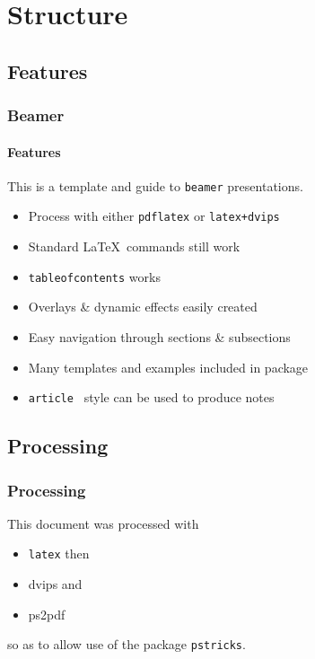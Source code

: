\section{Structure}
\subsection{Features}
\begin{frame}
\frametitle{Beamer}
\framesubtitle{Features}
This is a template and guide to \texttt{beamer} presentations.
\begin{itemize}
\item Process with either \texttt{pdflatex} or \texttt{latex+dvips}\pause
\item Standard \LaTeX\ commands still work\pause
\item \texttt{tableofcontents} works \pause
\item Overlays \&  dynamic effects easily created\pause
\item Easy navigation through sections \&  subsections\pause
\item Many templates and examples included in package\pause
\item \texttt{article } style can be used to produce notes
\end{itemize}
\end{frame}


\subsection{Processing}
\begin{frame}[fragile] 
 \frametitle{Processing}

This document was processed with 
\begin{itemize}
\item {\blue\texttt{latex}} \pause then 
\item {\blue dvips} \pause and
\item {\blue ps2pdf} 
\end{itemize}
so as to allow use of the package {\blue\texttt{pstricks}}.



\end{frame}
